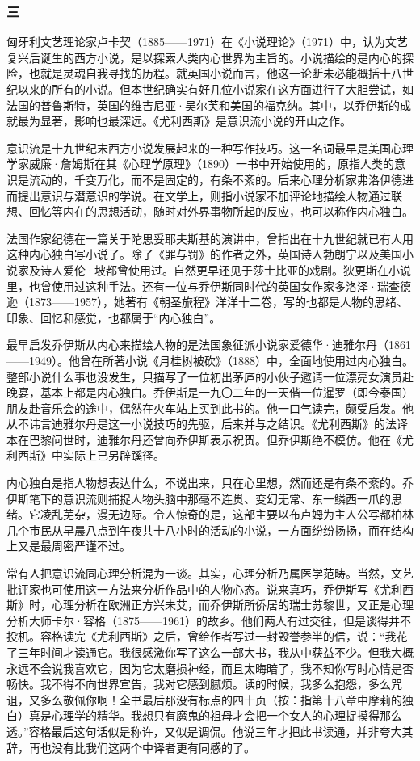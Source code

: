 \subsubsection*{三}
\par 匈牙利文艺理论家卢卡契（1885——1971）在《小说理论》（1971）中，认为文艺复兴后诞生的西方小说，是以探索人类内心世界为主旨的。小说描绘的是内心的探险，也就是灵魂自我寻找的历程。就英国小说而言，他这一论断未必能概括十八世纪以来的所有的小说。但本世纪确实有好几位小说家在这方面进行了大胆尝试，如法国的普鲁斯特，英国的维吉尼亚·吴尔芙和美国的福克纳。其中，以乔伊斯的成就最为显著，影响也最深远。《尤利西斯》是意识流小说的开山之作。
\par 意识流是十九世纪末西方小说发展起来的一种写作技巧。这一名词最早是美国心理学家威廉·詹姆斯在其《心理学原理》（1890）一书中开始使用的，原指人类的意识是流动的，千变万化，而不是固定的，有条不紊的。后来心理分析家弗洛伊德进而提出意识与潜意识的学说。在文学上，则指小说家不加评论地描绘人物通过联想、回忆等内在的思想活动，随时对外界事物所起的反应，也可以称作内心独白。
\par 法国作家纪德在一篇关于陀思妥耶夫斯基的演讲中，曾指出在十九世纪就已有人用这种内心独白写小说了。除了《罪与罚》的作者之外，英国诗人勃朗宁以及美国小说家及诗人爱伦·坡都曾使用过。自然更早还见于莎士比亚的戏剧。狄更斯在小说里，也曾使用过这种手法。还有一位与乔伊斯同时代的英国女作家多洛泽·瑞查德逊（1873——1957），她著有《朝圣旅程》洋洋十二卷，写的也都是人物的思绪、印象、回忆和感觉，也都属于“内心独白”。
\par 最早启发乔伊斯从内心来描绘人物的是法国象征派小说家爱德华·迪雅尔丹（1861——1949）。他曾在所著小说《月桂树被砍》（1888）中，全面地使用过内心独白。整部小说什么事也没发生，只描写了一位初出茅庐的小伙子邀请一位漂亮女演员赴晚宴，基本上都是内心独白。乔伊斯是一九〇二年的一天偕一位暹罗（即今泰国）朋友赴音乐会的途中，偶然在火车站上买到此书的。他一口气读完，颇受启发。他从不讳言迪雅尔丹是这一小说技巧的先驱，后来并与之结识。《尤利西斯》的法译本在巴黎问世时，迪雅尔丹还曾向乔伊斯表示祝贺。但乔伊斯绝不模仿。他在《尤利西斯》中实际上已另辟蹊径。
\par 内心独白是指人物想表达什么，不说出来，只在心里想，然而还是有条不紊的。乔伊斯笔下的意识流则捕捉人物头脑中那毫不连贯、变幻无常、东一鳞西一爪的思绪。它凌乱芜杂，漫无边际。令人惊奇的是，这部主要以布卢姆为主人公写都柏林几个市民从早晨八点到午夜共十八小时的活动的小说，一方面纷纷扬扬，而在结构上又是最周密严谨不过。
\par 常有人把意识流同心理分析混为一谈。其实，心理分析乃属医学范畴。当然，文艺批评家也可使用这一方法来分析作品中的人物心态。说来真巧，乔伊斯写《尤利西斯》时，心理分析在欧洲正方兴未艾，而乔伊斯所侨居的瑞士苏黎世，又正是心理分析大师卡尔·容格（1875——1961）的故乡。他们两人有过交往，但是谈得并不投机。容格读完《尤利西斯》之后，曾给作者写过一封毁誉参半的信，说：“我花了三年时间才读通它。我很感激你写了这么一部大书，我从中获益不少。但我大概永远不会说我喜欢它，因为它太磨损神经，而且太晦暗了，我不知你写时心情是否畅快。我不得不向世界宣告，我对它感到腻烦。读的时候，我多么抱怨，多么咒诅，又多么敬佩你啊！全书最后那没有标点的四十页（按：指第十八章中摩莉的独白）真是心理学的精华。我想只有魔鬼的祖母才会把一个女人的心理捉摸得那么透。”容格最后这句话似是称许，又似是调侃。他说三年才把此书读通，并非夸大其辞，再也没有比我们这两个中译者更有同感的了。
